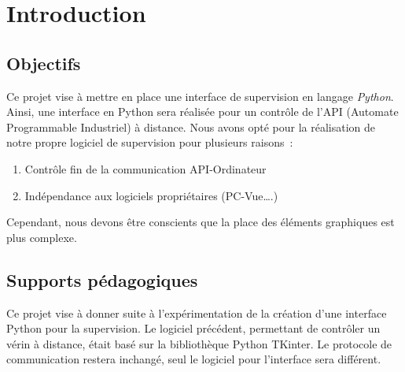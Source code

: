 
\chapter{Introduction}
\section{Objectifs}


Ce projet vise à mettre en place une interface de supervision en langage \emph{Python}.\newline
Ainsi, une interface en Python sera réalisée pour un contrôle de l’API (Automate Programmable Industriel) à distance. \newline
Nous avons opté pour la réalisation de notre propre logiciel de supervision pour plusieurs raisons : \newline

\begin{enumerate}
\item Contrôle fin de la communication API-Ordinateur
\item Indépendance aux logiciels propriétaires (PC-Vue….) \newline
\end{enumerate} 

Cependant, nous devons être conscients que la place des éléments graphiques est plus complexe.

\section{Supports pédagogiques}

Ce projet vise à donner suite à l'expérimentation de la création d'une interface Python pour la supervision. \newline
Le logiciel précédent, permettant de contrôler un vérin à distance, était basé sur la bibliothèque Python TKinter. \newline
Le protocole de communication restera inchangé, seul le logiciel pour l'interface sera différent.




